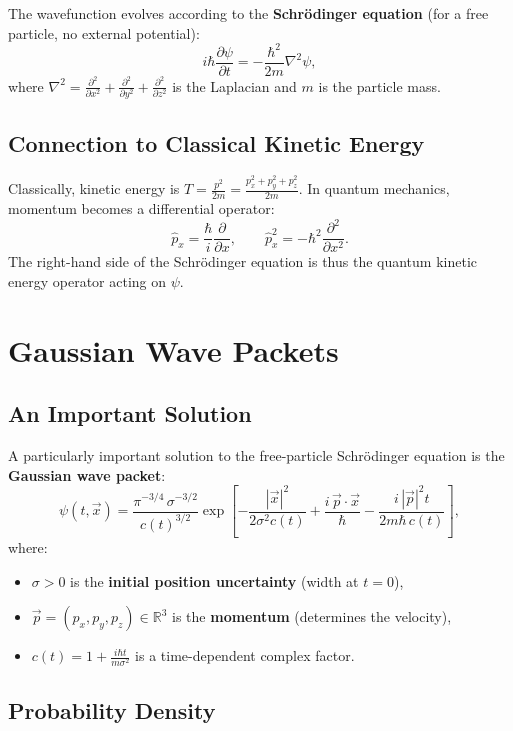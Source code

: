 \documentclass[11pt,a4paper]{article}
\theoremstyle{definition}
\theoremstyle{plain}
\theoremstyle{remark}
\begin{document}
The wavefunction evolves according to the \textbf{Schr\"odinger equation} (for a free particle, no external potential):
\[
    \boxed{i\hbar\frac{\partial \psi}{\partial t} = -\frac{\hbar^2}{2m}\nabla^2 \psi,}
\]
where $\nabla^2 = \frac{\partial^2}{\partial x^2} + \frac{\partial^2}{\partial y^2} + \frac{\partial^2}{\partial z^2}$ is the Laplacian and $m$ is the particle mass.

\subsection{Connection to Classical Kinetic Energy}

Classically, kinetic energy is $T = \frac{p^2}{2m} = \frac{p_x^2 + p_y^2 + p_z^2}{2m}$. In quantum mechanics, momentum becomes a differential operator:
\[
    \hat{p}_x = \frac{\hbar}{i}\frac{\partial}{\partial x}, \qquad \hat{p}_x^2 = -\hbar^2 \frac{\partial^2}{\partial x^2}.
\]
The right-hand side of the Schr\"odinger equation is thus the quantum kinetic energy operator acting on $\psi$.

\section{Gaussian Wave Packets}

\subsection{An Important Solution}

A particularly important solution to the free-particle Schr\"odinger equation is the \textbf{Gaussian wave packet}:
\[
    \psi(t, \vec{x}) = \frac{\pi^{-3/4}\,\sigma^{-3/2}}{c(t)^{3/2}} \exp\!\left[-\frac{|\vec{x}|^2}{2\sigma^2 c(t)} + \frac{i\,\vec{p}\cdot\vec{x}}{\hbar} - \frac{i\,|\vec{p}|^2 t}{2m\hbar\,c(t)}\right],
\]
where:
\begin{itemize}
    \item $\sigma > 0$ is the \textbf{initial position uncertainty} (width at $t=0$),
    \item $\vec{p} = (p_x, p_y, p_z) \in \mathbb{R}^3$ is the \textbf{momentum} (determines the velocity),
    \item $c(t) = 1 + \frac{i\hbar t}{m\sigma^2}$ is a time-dependent complex factor.
\end{itemize}

\subsection{Probability Density}
\end{document}
